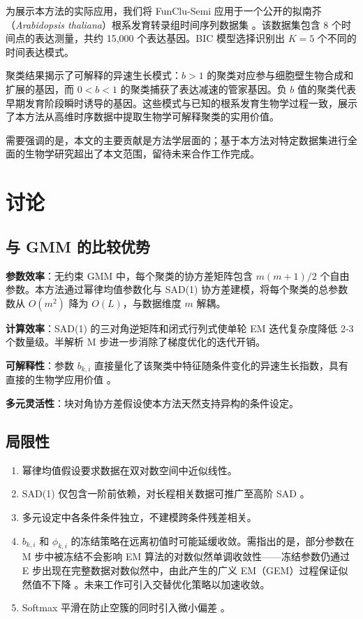 \documentclass[12pt,a4paper]{article}
\begin{document}
为展示本方法的实际应用，我们将 FunClu-Semi 应用于一个公开的拟南芥（\textit{Arabidopsis thaliana}）根系发育转录组时间序列数据集 \cite{li2010functional}。该数据集包含 8 个时间点的表达测量，共约 15,000 个表达基因。BIC 模型选择识别出 $K=5$ 个不同的时间表达模式。

聚类结果揭示了可解释的异速生长模式：$b > 1$ 的聚类对应参与细胞壁生物合成和扩展的基因，而 $0 < b < 1$ 的聚类捕获了表达减速的管家基因。负 $b$ 值的聚类代表早期发育阶段瞬时诱导的基因。这些模式与已知的根系发育生物学过程一致，展示了本方法从高维时序数据中提取生物学可解释聚类的实用价值。

需要强调的是，本文的主要贡献是方法学层面的；基于本方法对特定数据集进行全面的生物学研究超出了本文范围，留待未来合作工作完成。

\section{讨论}

\subsection{与 GMM 的比较优势}

\textbf{参数效率}：无约束 GMM 中，每个聚类的协方差矩阵包含 $m(m+1)/2$ 个自由参数。本方法通过幂律均值参数化与 SAD(1) 协方差建模，将每个聚类的总参数数从 $O(m^2)$ 降为 $O(L)$，与数据维度 $m$ 解耦。

\textbf{计算效率}：SAD(1) 的三对角逆矩阵和闭式行列式使单轮 EM 迭代复杂度降低 2-3 个数量级。半解析 M 步进一步消除了梯度优化的迭代开销。

\textbf{可解释性}：参数 $b_{k,i}$ 直接量化了该聚类中特征随条件变化的异速生长指数，具有直接的生物学应用价值 \cite{weiner2004allocation}。

\textbf{多元灵活性}：块对角协方差假设使本方法天然支持异构的条件设定。

\subsection{局限性}

\begin{enumerate}[leftmargin=*]
    \item 幂律均值假设要求数据在双对数空间中近似线性。
    \item SAD(1) 仅包含一阶前依赖，对长程相关数据可推广至高阶 SAD \cite{zimmerman2001parametric}。
    \item 多元设定中各条件条件独立，不建模跨条件残差相关。
    \item $b_{k,i}$ 和 $\phi_{k,i}$ 的冻结策略在远离初值时可能延缓收敛。需指出的是，部分参数在 M 步中被冻结不会影响 EM 算法的对数似然单调收敛性——冻结参数仍通过 E 步出现在完整数据对数似然中，由此产生的广义 EM（GEM）过程保证似然值不下降 \cite{banfield1993model}。未来工作可引入交替优化策略以加速收敛。
    \item Softmax 平滑在防止空簇的同时引入微小偏差 \cite{pan2026improved}。
\end{enumerate}
\end{document}
